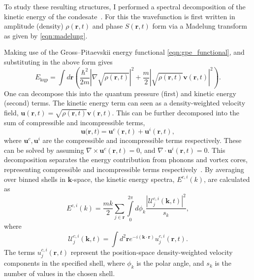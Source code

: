 To study these resulting structures, I performed a spectral decomposition of the kinetic energy of the condesate~\cite{CT:Nore_prl_1997,CT:Nore_pof_1997,CT:Bradley_prx_2012}. For this the wavefunction is first written in amplitude (density) $\rho(\mathbf{r},t)$ and phase $S(\mathbf{r},t)$ form via a Madelung transform as given by \ref{eqn:madelung}.
\iffalse
as
$
		\Psi(\mathbf{r},t) = \sqrt{\rho(\mathbf{r},t)}\exp{\left[\mathrm{i}S(\mathbf{r},t)\right]}.
$
\fi
Making use of the Gross--Pitaevskii energy functional \ref{eqn:gpe_functional}, and substituting in the above form gives
\begin{equation}
    E_{\text{kqp}} = \int d\mathbf{r} \left( \frac{\hbar^2}{2m}| \nabla\sqrt{\rho(\mathbf{r},t)} |^2  + \frac{m}{2}|\sqrt{\rho(\mathbf{r},t)}\mathbf{v}(\mathbf{r},t) |^2\right).
\end{equation}
One can decompose this into the quantum pressure (first) and kinetic energy (second) terms. The kinetic energy term can seen as a density-weighted velocity field, $\mathbf{u}(\mathbf{r},t) = \sqrt{\rho(\mathbf{r},t)}\mathbf{v}(\mathbf{r},t)$. This can be further decomposed into the sum of compressible and incompressible terms,
\begin{equation}
    \mathbf{u(r},t) = \mathbf{u}^c(\mathbf{r},t) + \mathbf{u}^i(\mathbf{r},t),
\end{equation}
where $\mathbf{u}^c, \mathbf{u}^i$ are the compressible and incompressible terms respectively. These can be solved by assuming $\nabla \times \mathbf{u}^c(\mathbf{r},t) = 0$, and $\nabla \cdot \mathbf{u}^i(\mathbf{r},t) = 0$. This decomposition separates the energy contribution from phonons and vortex cores, representing compressible and incompressible terms respectively~\cite{CT:Horng_pra_2009}. By averaging over binned shells in $\mathbf{k}$-space, the kinetic energy spectra, $E^{c,i}(k)$, are calculated as~\cite{CT:Bradley_prx_2012}
\begin{equation}
	E^{c,i}(k) = \frac{mk}{2}\sum\limits_{j\in\mathbf{r}} \int\limits_{0}^{2\pi}d\phi_k \frac{ |\mathcal{U}_j^{c,i}(\mathbf{k},t) |^2}{s_k},
\end{equation}
where
\begin{equation}
	\mathcal{U}_j^{c,i}(\mathbf{k},t) = \int d^2 \mathbf{r} e^{-i(\mathbf{k}\cdot\mathbf{r})} u_j^{c,i}(\mathbf{r},t).
\end{equation}
The terms $u_j^{c,i}(\mathbf{r},t)$ represent the position-space density-weighted velocity components in the specified shell, where $\phi_k$ is the polar angle, and $s_k$ is the number of values in the chosen shell.

